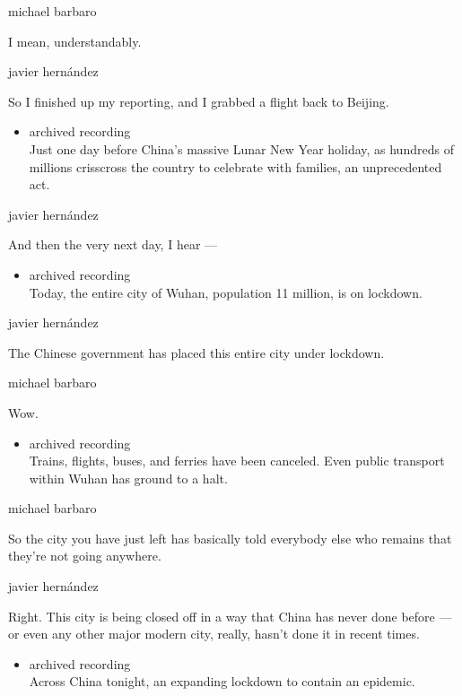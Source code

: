 michael barbaro

I mean, understandably.

javier hernández

So I finished up my reporting, and I grabbed a flight back to Beijing.

\begin{itemize}
\tightlist
\item
  archived recording\\
  Just one day before China's massive Lunar New Year holiday, as
  hundreds of millions crisscross the country to celebrate with
  families, an unprecedented act.
\end{itemize}

javier hernández

And then the very next day, I hear ---

\begin{itemize}
\tightlist
\item
  archived recording\\
  Today, the entire city of Wuhan, population 11 million, is on
  lockdown.
\end{itemize}

javier hernández

The Chinese government has placed this entire city under lockdown.

michael barbaro

Wow.

\begin{itemize}
\tightlist
\item
  archived recording\\
  Trains, flights, buses, and ferries have been canceled. Even public
  transport within Wuhan has ground to a halt.
\end{itemize}

michael barbaro

So the city you have just left has basically told everybody else who
remains that they're not going anywhere.

javier hernández

Right. This city is being closed off in a way that China has never done
before --- or even any other major modern city, really, hasn't done it
in recent times.

\begin{itemize}
\tightlist
\item
  archived recording\\
  Across China tonight, an expanding lockdown to contain an epidemic.
\end{itemize}

